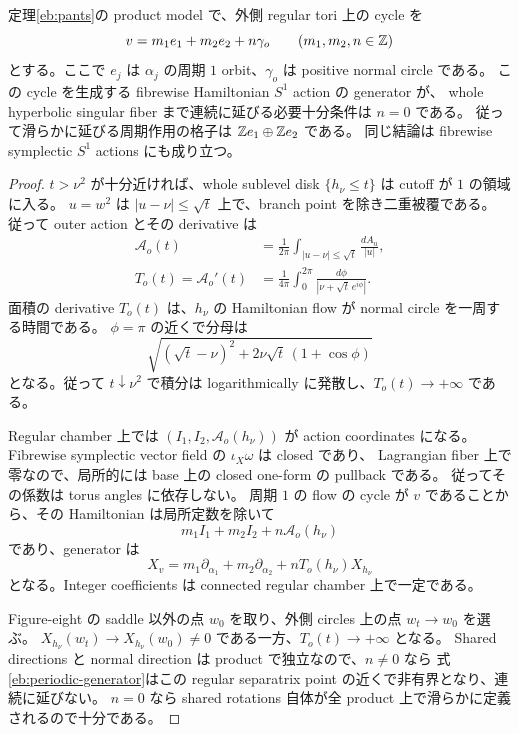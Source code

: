 \begin{proposition}\label{eb:periodic-lattice}
定理\ref{eb:pants}の product model で、外側 regular tori 上の cycle を
\[
 v=m_1e_1+m_2e_2+n\gamma_o\qquad(m_1,m_2,n\in\mathbb Z)
\]
とする。ここで $e_j$ は $\alpha_j$ の周期 $1$ orbit、$\gamma_o$ は positive normal circle である。
この cycle を生成する fibrewise Hamiltonian $S^1$ action の generator が、
whole hyperbolic singular fiber まで連続に延びる必要十分条件は $n=0$ である。
従って滑らかに延びる周期作用の格子は $\mathbb Z e_1\oplus\mathbb Z e_2$ である。
同じ結論は fibrewise symplectic $S^1$ actions にも成り立つ。
\end{proposition}

\begin{proof}
$t>\nu^2$ が十分近ければ、whole sublevel disk $\{h_\nu\le t\}$ は cutoff が $1$ の領域に入る。
$u=w^2$ は $|u-\nu|\le\sqrt t$ 上で、branch point を除き二重被覆である。
従って outer action とその derivative は
\begin{align}
 \mathcal A_o(t)
   &=\frac1{2\pi}\int_{|u-\nu|\le\sqrt t}\frac{dA_u}{|u|},
       \label{eb:outer-action-integral}\\
 T_o(t)=\mathcal A_o'(t)
   &=\frac1{4\pi}\int_0^{2\pi}
       \frac{d\phi}{|\nu+\sqrt t\,e^{i\phi}|}.
       \label{eb:outer-period}
\end{align}
面積の derivative $T_o(t)$ は、$h_\nu$ の Hamiltonian flow が normal circle を一周する時間である。
$\phi=\pi$ の近くで分母は
\[
 \sqrt{(\sqrt t-\nu)^2+2\nu\sqrt t\,(1+\cos\phi)}
\]
となる。従って $t\downarrow\nu^2$ で積分は logarithmically に発散し、$T_o(t)\to+\infty$ である。

Regular chamber 上では $(I_1,I_2,\mathcal A_o(h_\nu))$ が action coordinates になる。
Fibrewise symplectic vector field の $\iota_X\omega$ は closed であり、
Lagrangian fiber 上で零なので、局所的には base 上の closed one-form の pullback である。
従ってその係数は torus angles に依存しない。
周期 $1$ の flow の cycle が $v$ であることから、その Hamiltonian は局所定数を除いて
\[
 m_1I_1+m_2I_2+n\mathcal A_o(h_\nu)
\]
であり、generator は
\begin{equation}\label{eb:periodic-generator}
 X_v=m_1\partial_{\alpha_1}+m_2\partial_{\alpha_2}
               +nT_o(h_\nu)X_{h_\nu}
\end{equation}
となる。Integer coefficients は connected regular chamber 上で一定である。

Figure-eight の saddle 以外の点 $w_0$ を取り、外側 circles 上の点 $w_t\to w_0$ を選ぶ。
$X_{h_\nu}(w_t)\to X_{h_\nu}(w_0)\ne0$ である一方、$T_o(t)\to+\infty$ となる。
Shared directions と normal direction は product で独立なので、$n\ne0$ なら
式\eqref{eb:periodic-generator}はこの regular separatrix point の近くで非有界となり、連続に延びない。
$n=0$ なら shared rotations 自体が全 product 上で滑らかに定義されるので十分である。
\end{proof}

